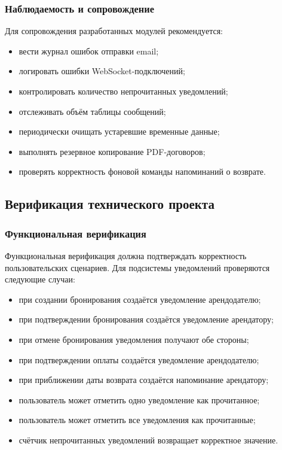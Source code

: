 \subsubsection{Наблюдаемость и сопровождение}
Для сопровождения разработанных модулей рекомендуется:
\begin{itemize}
    \item вести журнал ошибок отправки email;
    \item логировать ошибки WebSocket-подключений;
    \item контролировать количество непрочитанных уведомлений;
    \item отслеживать объём таблицы сообщений;
    \item периодически очищать устаревшие временные данные;
    \item выполнять резервное копирование PDF-договоров;
    \item проверять корректность фоновой команды напоминаний о возврате.
\end{itemize}

\subsection{Верификация технического проекта}

\subsubsection{Функциональная верификация}
Функциональная верификация должна подтверждать корректность пользовательских сценариев. Для подсистемы уведомлений проверяются следующие случаи:
\begin{itemize}
    \item при создании бронирования создаётся уведомление арендодателю;
    \item при подтверждении бронирования создаётся уведомление арендатору;
    \item при отмене бронирования уведомления получают обе стороны;
    \item при подтверждении оплаты создаётся уведомление арендодателю;
    \item при приближении даты возврата создаётся напоминание арендатору;
    \item пользователь может отметить одно уведомление как прочитанное;
    \item пользователь может отметить все уведомления как прочитанные;
    \item счётчик непрочитанных уведомлений возвращает корректное значение.
\end{itemize}

